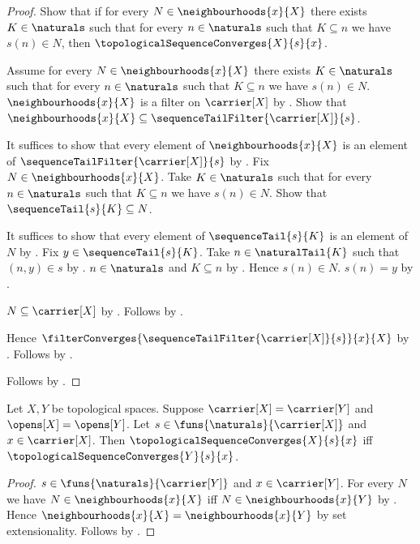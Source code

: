 \begin{proof}
    Show that if for every $N\in\neighbourhoods{x}{X}$ there exists
        $K\in\naturals$ such that for every $n\in\naturals$
        such that $K\subseteq n$ we have $s(n)\in N$, then
        $\topologicalSequenceConverges{X}{s}{x}$.
    \begin{subproof}
        Assume for every $N\in\neighbourhoods{x}{X}$ there exists
            $K\in\naturals$ such that for every $n\in\naturals$
            such that $K\subseteq n$ we have $s(n)\in N$.
        $\neighbourhoods{x}{X}$ is a filter on $\carrier[X]$
            by .
        Show that $\neighbourhoods{x}{X}
            \subseteq\sequenceTailFilter{\carrier[X]}{s}$.
        \begin{subproof}
            It suffices to show that every element of
                $\neighbourhoods{x}{X}$ is an element of
                $\sequenceTailFilter{\carrier[X]}{s}$ by .
            Fix $N\in\neighbourhoods{x}{X}$.
            Take $K\in\naturals$ such that for every $n\in\naturals$
                such that $K\subseteq n$ we have $s(n)\in N$.
            Show that $\sequenceTail{s}{K}\subseteq N$.
            \begin{subproof}
                It suffices to show that every element of
                    $\sequenceTail{s}{K}$ is an element of $N$
                    by .
                Fix $y\in\sequenceTail{s}{K}$.
                Take $n\in\naturalTail{K}$ such that $(n,y)\in s$
                    by .
                $n\in\naturals$ and $K\subseteq n$
                    by .
                Hence $s(n)\in N$.
                $s(n)=y$ by .
            \end{subproof}
            $N\subseteq\carrier[X]$ by .
            Follows by .
        \end{subproof}
        Hence $\filterConverges
            {\sequenceTailFilter{\carrier[X]}{s}}{x}{X}$
            by .
        Follows by .
    \end{subproof}
    Follows by \auto.
\end{proof}

\begin{theorem}\label{topological_sequence_convergence_invariant}
    Let $X,Y$ be topological spaces.
    Suppose $\carrier[X]=\carrier[Y]$ and $\opens[X]=\opens[Y]$.
    Let $s\in\funs{\naturals}{\carrier[X]}$ and $x\in\carrier[X]$.
    Then $\topologicalSequenceConverges{X}{s}{x}$ iff
        $\topologicalSequenceConverges{Y}{s}{x}$.
\end{theorem}
\begin{proof}
    $s\in\funs{\naturals}{\carrier[Y]}$ and $x\in\carrier[Y]$.
    For every $N$ we have $N\in\neighbourhoods{x}{X}$ iff
        $N\in\neighbourhoods{x}{Y}$ by .
    Hence $\neighbourhoods{x}{X}=\neighbourhoods{x}{Y}$ by
        set extensionality.
    Follows by
        .
\end{proof}

